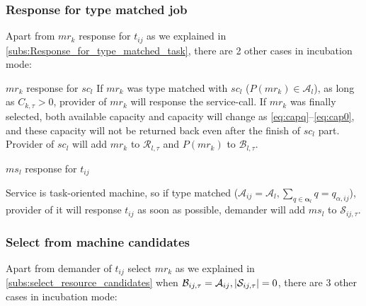 \subsubsection{Response for type matched job} %
\label{ssub:response_in_type_matched_resource}
Apart from $mr_k$ response for $t_{ij}$ as we explained in \autoref{subs:Response_for_type_matched_task}, there are 2 other cases in incubation mode:
\begin{asparaenum}
\item $mr_k$ response for $sc_l$
If $mr_k$ was type matched with $sc_l$ ($P(mr_k)\in\mathcal{A}_l$), as long as $C_{k,\tau}> 0$, provider of $mr_k$ will response the service-call. If $mr_k$ was finally selected, both available capacity and capacity will change as \autoref{eq:capq}--\ref{eq:cap0}, and these capacity will not be returned back even after the finish of $sc_l$ part. Provider of $sc_l$ will add $mr_k$ to $\mathcal{R}_{l,\tau}$ and $P(mr_k)$ to $\mathcal{B}_{l,\tau}$.
\item $ms_l$ response for $t_{ij}$
\end{asparaenum}
Service is task-oriented machine, so if type matched ($\mathcal{A}_{ij} =\mathcal{A}_l,\sum_{q\in\bm{\alpha}_l} q = q_{\alpha,ij}$), provider of it will response $t_{ij}$ as soon as possible, demander will add $ms_l$ to $\mathcal{S}_{ij,\tau}$.


\subsubsection{Select from machine candidates} %
\label{ssub:selection_in_resource_candidates_for_service_call}
Apart from demander of $t_{ij}$ select $mr_k$ as we explained in \autoref{subs:select_resource_candidates} when $\mathcal{B}_{ij,\tau} = \mathcal{A}_{ij},\left|\mathcal{S}_{ij,\tau}\right|=0$, there are 3 other cases in incubation mode:

